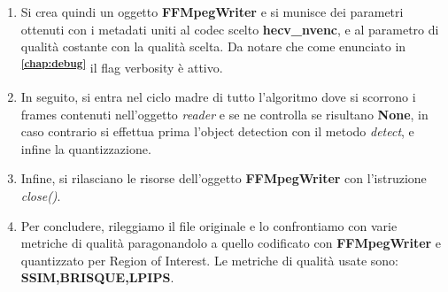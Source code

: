 \begin{enumerate}
\item Si crea quindi un oggetto \textbf{FFMpegWriter} e si munisce dei parametri ottenuti con i metadati uniti al codec scelto \textbf{hecv\_nvenc}, e al parametro di qualità costante con la qualità scelta. Da notare che come enunciato in \textsuperscript{\textbf{\ref{chap:debug}}} il flag verbosity è attivo.
\item In seguito, si entra nel ciclo madre di tutto l'algoritmo dove si scorrono i frames contenuti nell'oggetto \emph{reader} e se ne controlla se risultano \textbf{None}, in caso contrario si effettua prima l'object detection con il metodo \emph{detect}, e infine la quantizzazione.
\item Infine, si rilasciano le risorse dell'oggetto  \textbf{FFMpegWriter} con l'istruzione \emph{close()}.
\item Per concludere, rileggiamo il file originale e lo confrontiamo con varie metriche di qualità paragonandolo a quello codificato con \textbf{FFMpegWriter} e quantizzato per Region of Interest. Le metriche di qualità usate sono: \textbf{SSIM,BRISQUE,LPIPS}.
\end{enumerate}
